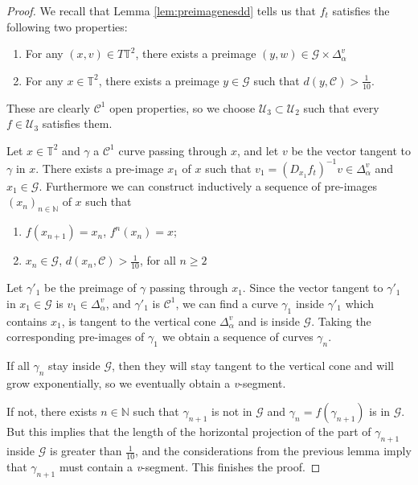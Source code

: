 \documentclass[11pt,letterpaper,reqno]{article}
\newcommand{\TT}{\mathbb{T}^2}
\newcommand{\Dev}{\Delta_{\alpha}^v}
\begin{document}
\begin{proof}

We recall that  Lemma \ref{lem:preimagenesdd} tells us that $f_t$ satisfies the following two properties:
\begin{enumerate}
\item
For any $(x,v)\in T\TT$, there exists a preimage $(y,w)\in \mathcal G\times \Dev$
\item
For any $x\in\TT$, there exists a preimage $y\in\mathcal G$ such that $d(y,\mathcal C)>\frac 1{10}$.
\end{enumerate}

These are clearly $\mathcal C^1$ open properties, so we choose $\mathcal U_3\subset\mathcal U_2$ such that every $f\in\mathcal U_3$ satisfies them.

Let $x\in\TT$ and $\gamma$ a $\mathcal C^1$ curve passing through $x$, and let $v$ be the vector tangent to $\gamma$ in $x$. There exists a pre-image $x_1$ of $x$ such that $v_1=(D_{x_1}f_t)^{-1}v\in\Dev$ and $x_1\in\mathcal G$. Furthermore we can construct inductively a sequence of pre-images $(x_n)_{n\in\mathbb N}$ of $x$ such that
\begin{enumerate}
\item
$f(x_{n+1})=x_n$, $f^n(x_n)=x$;
\item
$x_n\in\mathcal G$, $d(x_n,\mathcal C)>\frac 1{10}$, for all $n\geq 2$
\end{enumerate}
Let $\gamma'_1$ be the preimage of $\gamma$ passing through $x_1$. Since the vector tangent to $\gamma'_1$ in $x_1\in\mathcal G$ is $v_1\in\Dev$, and $\gamma'_1$ is $\mathcal C^1$, we can find a curve $\gamma_1$ inside $\gamma'_1$ which contains $x_1$, is tangent to the vertical cone $\Dev$ and is inside $\mathcal G$. Taking the corresponding pre-images of $\gamma_1$ we obtain a sequence of curves $\gamma_n$.

If all $\gamma_n$ stay inside $\mathcal G$, then they will stay tangent to the vertical cone and will grow exponentially, so we eventually obtain a \textit{v}-segment.

If not, there exists $n\in\mathbb N$ such that $\gamma_{n+1}$ is not in $\mathcal G$ and $\gamma_n=f(\gamma_{n+1})$ is in $\mathcal G$. But this implies that the length of the horizontal projection of the part of $\gamma_{n+1}$ inside $\mathcal G$ is greater than $\frac 1{10}$, and the considerations from the previous lemma imply that $\gamma_{n+1}$ must contain a \textit{v}-segment. This finishes the proof.

\end{proof}
\end{document}
